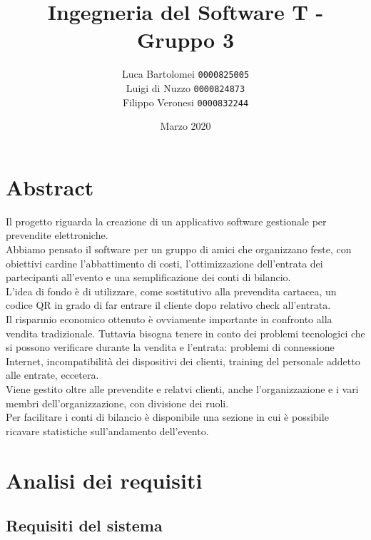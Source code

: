 \documentclass[a4paper]{article}
\title{Ingegneria del Software T - Gruppo 3}
\author{
    Luca Bartolomei 
    \texttt{0000825005}
    \\
    Luigi di Nuzzo
    \texttt{0000824873}
    \\
    Filippo Veronesi
    \texttt{0000832244}
}
\date{Marzo 2020}
\begin{document}
\newcommand{\mc}[2]{\multicolumn{#1}{>{\setlength{\hsize}{#1\hsize}}X|}{#2}}
\newcommand{\mcc}[2]{\multicolumn{#1}{|l|}{#2}}

\maketitle

\tableofcontents

\newpage

\section{Abstract}

Il progetto riguarda la creazione di un applicativo software gestionale per prevendite elettroniche.\\Abbiamo pensato il software per un gruppo di amici che organizzano feste, con obiettivi cardine l'abbattimento di costi, l'ottimizzazione dell'entrata dei partecipanti all'evento e una semplificazione dei conti di bilancio.\\L'idea di fondo è di utilizzare, come sostitutivo alla prevendita cartacea, un codice QR in grado di far entrare il cliente dopo relativo check all'entrata.\\Il risparmio economico ottenuto è ovviamente importante in confronto alla vendita tradizionale. Tuttavia bisogna tenere in conto dei problemi tecnologici che si possono verificare durante la vendita e l'entrata: problemi di connessione Internet, incompatibilità dei dispositivi dei clienti, training del personale addetto alle entrate, eccetera.\\Viene gestito oltre alle prevendite e relatvi clienti, anche l'organizzazione e i vari membri dell'organizzazione, con divisione dei ruoli.\\Per facilitare i conti di bilancio è disponibile una sezione in cui è possibile ricavare statistiche sull'andamento dell'evento.

\newpage

\section{Analisi dei requisiti}

\subsection{Requisiti del sistema}
\end{document}
